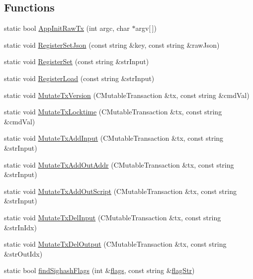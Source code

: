 \subsection*{Functions}
\begin{DoxyCompactItemize}
\item 
static bool \mbox{\hyperlink{bitcoin-tx_8cpp_affd2ff3bf9c0ed318f1f4d826d5e8098}{App\+Init\+Raw\+Tx}} (int argc, char $\ast$argv\mbox{[}$\,$\mbox{]})
\item 
static void \mbox{\hyperlink{bitcoin-tx_8cpp_ab76cd7e2720549ae2cf2e6d865d3c540}{Register\+Set\+Json}} (const string \&key, const string \&raw\+Json)
\item 
static void \mbox{\hyperlink{bitcoin-tx_8cpp_a49f74fa4e0a49edded1509f1b1a918ba}{Register\+Set}} (const string \&str\+Input)
\item 
static void \mbox{\hyperlink{bitcoin-tx_8cpp_afa6156b7dd460f3a4563a7ac349bc24c}{Register\+Load}} (const string \&str\+Input)
\item 
static void \mbox{\hyperlink{bitcoin-tx_8cpp_a68013967fade46cf0fb36f4a9dbf88a3}{Mutate\+Tx\+Version}} (C\+Mutable\+Transaction \&tx, const string \&cmd\+Val)
\item 
static void \mbox{\hyperlink{bitcoin-tx_8cpp_ac6ccb558dabe8d77860d895ed9c1531c}{Mutate\+Tx\+Locktime}} (C\+Mutable\+Transaction \&tx, const string \&cmd\+Val)
\item 
static void \mbox{\hyperlink{bitcoin-tx_8cpp_a54211e2ff2d8fcc5b0c3c1b439d392a4}{Mutate\+Tx\+Add\+Input}} (C\+Mutable\+Transaction \&tx, const string \&str\+Input)
\item 
static void \mbox{\hyperlink{bitcoin-tx_8cpp_af42e5437bd7f7d997f4bd789186684ce}{Mutate\+Tx\+Add\+Out\+Addr}} (C\+Mutable\+Transaction \&tx, const string \&str\+Input)
\item 
static void \mbox{\hyperlink{bitcoin-tx_8cpp_a2cc4d56e385bafe0e2b4b8f2e1e995b0}{Mutate\+Tx\+Add\+Out\+Script}} (C\+Mutable\+Transaction \&tx, const string \&str\+Input)
\item 
static void \mbox{\hyperlink{bitcoin-tx_8cpp_ab2bda3d7f26af75190e0b1b817f0c556}{Mutate\+Tx\+Del\+Input}} (C\+Mutable\+Transaction \&tx, const string \&str\+In\+Idx)
\item 
static void \mbox{\hyperlink{bitcoin-tx_8cpp_ae36a9e3dbb97338e50688398a51132c9}{Mutate\+Tx\+Del\+Output}} (C\+Mutable\+Transaction \&tx, const string \&str\+Out\+Idx)
\item 
static bool \mbox{\hyperlink{bitcoin-tx_8cpp_a804f2eb1021c3fc5b3c163897588925f}{find\+Sighash\+Flags}} (int \&\mbox{\hyperlink{bitcoin-tx_8cpp_ac8bf36fe0577cba66bccda3a6f7e80a4}{flags}}, const string \&\mbox{\hyperlink{bitcoin-tx_8cpp_a4c63caa32881965b29b571644c25ef2a}{flag\+Str}})

\end{DoxyCompactItemize}
